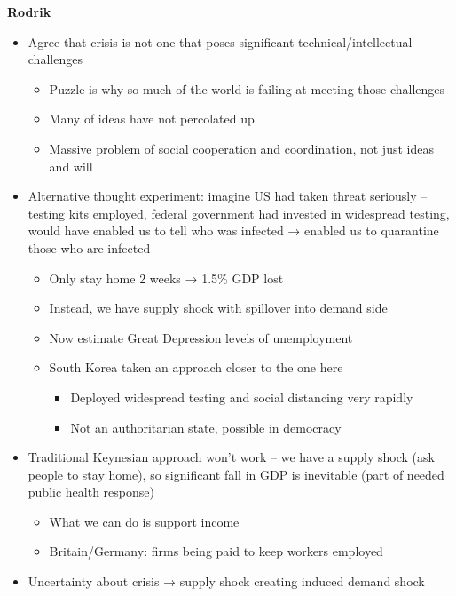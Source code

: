 \textbf{Rodrik}

\begin{itemize}
\tightlist
\item
  Agree that crisis is not one that poses significant
  technical/intellectual challenges

  \begin{itemize}
  \tightlist
  \item
    Puzzle is why so much of the world is failing at meeting those
    challenges
  \item
    Many of ideas have not percolated up
  \item
    Massive problem of social cooperation and coordination, not just
    ideas and will
  \end{itemize}
\item
  Alternative thought experiment: imagine US had taken threat seriously
  -- testing kits employed, federal government had invested in
  widespread testing, would have enabled us to tell who was infected →
  enabled us to quarantine those who are infected

  \begin{itemize}
  \tightlist
  \item
    Only stay home 2 weeks → 1.5\% GDP lost
  \item
    Instead, we have supply shock with spillover into demand side
  \item
    Now estimate Great Depression levels of unemployment
  \item
    South Korea taken an approach closer to the one here

    \begin{itemize}
    \tightlist
    \item
      Deployed widespread testing and social distancing very rapidly
    \item
      Not an authoritarian state, possible in democracy
    \end{itemize}
  \end{itemize}
\item
  Traditional Keynesian approach won't work -- we have a supply shock
  (ask people to stay home), so significant fall in GDP is inevitable
  (part of needed public health response)

  \begin{itemize}
  \tightlist
  \item
    What we can do is support income
  \item
    Britain/Germany: firms being paid to keep workers employed
  \end{itemize}
\item
  Uncertainty about crisis → supply shock creating induced demand shock


\end{itemize}
